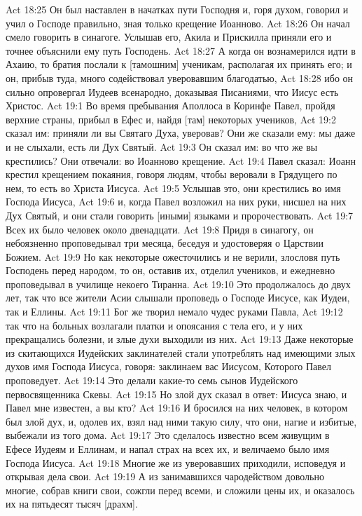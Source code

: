 Act 18:25  Он был наставлен в начатках пути Господня и, горя духом, говорил и учил о Господе правильно, зная только крещение Иоанново.
Act 18:26  Он начал смело говорить в синагоге. Услышав его, Акила и Прискилла приняли его и точнее объяснили ему путь Господень.
Act 18:27  А когда он вознамерился идти в Ахаию, то братия послали к [тамошним] ученикам, располагая их принять его; и он, прибыв туда, много содействовал уверовавшим благодатью,
Act 18:28  ибо он сильно опровергал Иудеев всенародно, доказывая Писаниями, что Иисус есть Христос.
Act 19:1  Во время пребывания Аполлоса в Коринфе Павел, пройдя верхние страны, прибыл в Ефес и, найдя [там] некоторых учеников,
Act 19:2  сказал им: приняли ли вы Святаго Духа, уверовав? Они же сказали ему: мы даже и не слыхали, есть ли Дух Святый.
Act 19:3  Он сказал им: во что же вы крестились? Они отвечали: во Иоанново крещение.
Act 19:4  Павел сказал: Иоанн крестил крещением покаяния, говоря людям, чтобы веровали в Грядущего по нем, то есть во Христа Иисуса.
Act 19:5  Услышав это, они крестились во имя Господа Иисуса,
Act 19:6  и, когда Павел возложил на них руки, нисшел на них Дух Святый, и они стали говорить [иными] языками и пророчествовать.
Act 19:7  Всех их было человек около двенадцати.
Act 19:8  Придя в синагогу, он небоязненно проповедывал три месяца, беседуя и удостоверяя о Царствии Божием.
Act 19:9  Но как некоторые ожесточились и не верили, злословя путь Господень перед народом, то он, оставив их, отделил учеников, и ежедневно проповедывал в училище некоего Тиранна.
Act 19:10  Это продолжалось до двух лет, так что все жители Асии слышали проповедь о Господе Иисусе, как Иудеи, так и Еллины.
Act 19:11  Бог же творил немало чудес руками Павла,
Act 19:12  так что на больных возлагали платки и опоясания с тела его, и у них прекращались болезни, и злые духи выходили из них.
Act 19:13  Даже некоторые из скитающихся Иудейских заклинателей стали употреблять над имеющими злых духов имя Господа Иисуса, говоря: заклинаем вас Иисусом, Которого Павел проповедует.
Act 19:14  Это делали какие-то семь сынов Иудейского первосвященника Скевы.
Act 19:15  Но злой дух сказал в ответ: Иисуса знаю, и Павел мне известен, а вы кто?
Act 19:16  И бросился на них человек, в котором был злой дух, и, одолев их, взял над ними такую силу, что они, нагие и избитые, выбежали из того дома.
Act 19:17  Это сделалось известно всем живущим в Ефесе Иудеям и Еллинам, и напал страх на всех их, и величаемо было имя Господа Иисуса.
Act 19:18  Многие же из уверовавших приходили, исповедуя и открывая дела свои.
Act 19:19  А из занимавшихся чародейством довольно многие, собрав книги свои, сожгли перед всеми, и сложили цены их, и оказалось их на пятьдесят тысяч [драхм].
